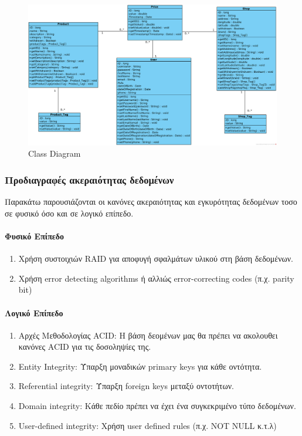\begin{figure}[H]
    \centering
    \includegraphics[width = \linewidth]{media/DB/Database.png}
    \caption{Class Diagram}
\end{figure}




\subsubsection{Προδιαγραφές ακεραιότητας δεδομένων}
Παρακάτω παρουσιάζονται οι κανόνες ακεραιότητας και εγκυρότητας δεδομένων τοσο σε φυσικό όσο και σε λογικό επίπεδο.

\paragraph*{Φυσικό Επίπεδο}
\begin{enumerate}
    \item Χρήση συστοιχιών RAID για αποφυγή σφαλμάτων υλικού στη βάση δεδομένων.
    \item Χρήση error detecting algorithms ή αλλιώς error-correcting codes (π.χ. parity bit)
\end{enumerate}

\paragraph*{Λογικό Επίπεδο}
\begin{enumerate}
    \item Αρχές Μεθοδολογίας ACID: Η βάση δεομένων μας θα πρέπει να ακολουθει κανόνες ACID για τις δοσοληψίες της.
    \item Entity Integrity: Ύπαρξη μοναδικών primary keys για κάθε οντότητα.
    \item Referential integrity: Ύπαρξη foreign keys μεταξύ οντοτήτων.
    \item Domain integrity: Κάθε πεδίο πρέπει να έχει ένα συγκεκριμένο τύπο δεδομένων.
    \item User-defined integrity: Χρήση user defined rules (π.χ. NOT NULL κ.τ.λ)
\end{enumerate}

